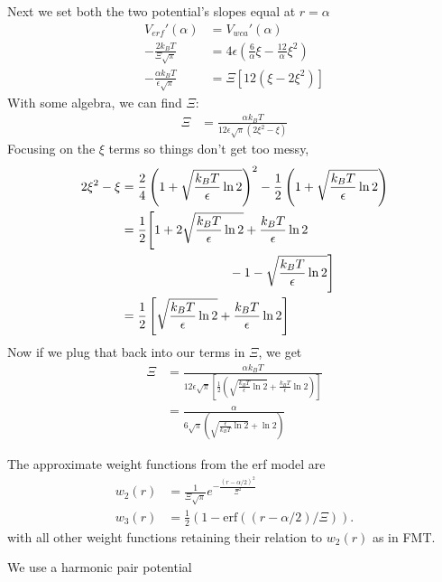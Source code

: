 \documentclass[letterpaper,twocolumn,amsmath,amssymb,prb]{revtex4-1}
\begin{document}
Next we set both the two potential's slopes equal at $r = \alpha$
\begin{align}
  V_{erf}'(\alpha) &= V_{wca}'(\alpha) \\
  -\frac{2 k_B T}{\Xi \sqrt{\pi}} &= 4\epsilon \left(
  \frac{6}{\alpha} \xi - \frac{12}{\alpha} \xi^2 \right) \\
  -\frac{\alpha k_B T}{\epsilon \sqrt{\pi}} &= \Xi \left[12 \left(
  \xi - 2\xi^2 \right)\right]
\end{align}
With some algebra, we can find $\Xi$:
\begin{align}
  \Xi &= \frac{\alpha k_B T}{12\epsilon \sqrt{\pi} \left( 2 \xi^2 - \xi
    \right)}
\end{align}
Focusing on the $\xi$ terms so things don't get too messy,
\begin{align}
  2 \xi^2 - \xi &=  \frac{2}{4}\left(1 +
  \sqrt{ \frac{k_BT}{\epsilon} \ln 2} \right)^2
  - \frac{1}{2}\left(1 +
  \sqrt{ \frac{k_BT}{\epsilon} \ln 2} \right) \\
  &= \frac{1}{2}\Bigg[ 1 + 2\sqrt{ \frac{k_BT}{\epsilon}\ln 2} +
    \frac{k_BT}{\epsilon}\ln 2 \notag \\
    &\hspace{3cm}-1 -\sqrt{ \frac{k_BT}{\epsilon} \ln 2} \Bigg] \\
  &=\frac{1}{2}\left[ \sqrt{ \frac{k_BT}{\epsilon} \ln 2} +
    \frac{k_BT}{\epsilon} \ln 2 \right]
\end{align}
Now if we plug that back into our terms in $\Xi$, we get
\begin{align}
  \Xi &= \frac{\alpha k_B T}{12\epsilon \sqrt{\pi} \left[\frac{1}{2}\left(
      \sqrt{ \frac{k_BT}{\epsilon} \ln 2} + \frac{k_BT}{\epsilon}
      \ln 2 \right)\right] } \\
  &= \frac{\alpha}{6\sqrt{\pi} \left( \sqrt{\frac{\epsilon}{k_BT} \ln
      2} + \ln 2 \right)}
\end{align}

The approximate weight functions from the erf model are
\begin{align}
  w_2(r) &= \frac{1}{\Xi \sqrt{\pi}} e^{-\frac{(r-\alpha/2)^2}{\Xi^2}} \\
  w_3(r) &= \tfrac12 ( 1 - \mathrm{erf}((r-\alpha/2)/\Xi) ).
\end{align}
with all other weight functions retaining their relation to $w_2(r)$
as in FMT.


We use a harmonic pair potential
\end{document}
